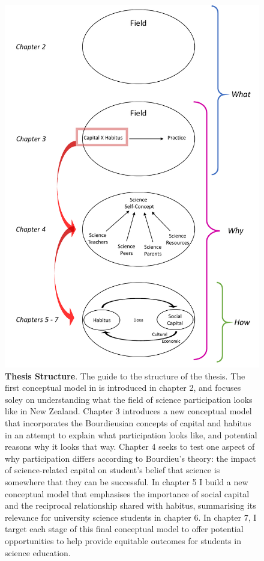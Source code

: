 \begin{figure}[h]
    \centering
    \includegraphics[width = \textwidth]{C1 - Introduction/Thesis_structure_guide.pdf}
    \caption{\textbf{Thesis Structure}. The guide to the structure of the thesis. The first conceptual model in is introduced in chapter 2, and focuses soley on understanding what the field of science participation looks like in New Zealand. Chapter 3 introduces a new conceptual model that incorporates the Bourdieusian concepts of capital and habitus in an attempt to explain what participation looks like, and potential reasons why it looks that way. Chapter 4 seeks to test one aspect of why participation differs according to Bourdieu's theory: the impact of science-related capital on student's belief that science is somewhere that they can be successful. In chapter 5 I build a new conceptual model that emphasises the importance of social capital and the reciprocal relationship shared with habitus, summarising its relevance for university science students in chapter 6. In chapter 7, I target each stage of this final conceptual model to offer potential opportunities to help provide equitable outcomes for students in science education. 
    }
    
    \label{fig:thesis_guide}
\end{figure}


